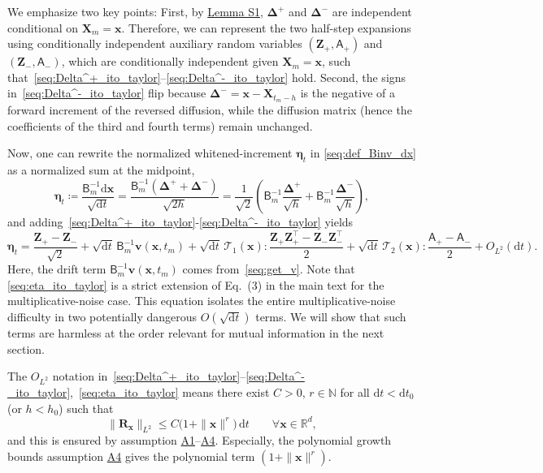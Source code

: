 \documentclass[
 longbibliography,
 twocolumn,
 superscriptaddress,
 amsmath,
 amssymb,
 amsthm,
 amsfonts,
 prl,
 floatfix,
]{revtex4-2}
\newcommand{\matbf}[1]{\boldsymbol{\mathsf{#1}}}
\begin{document}
\begin{widetext}
We emphasize two key points: First, by \hyperlink{lem:S1}{Lemma S1}, $\bm{\Delta}^+$ and $\bm{\Delta}^-$ are independent conditional on $\bm{X}_m=\bm{x}$.
Therefore, we can represent the two half-step expansions using conditionally independent auxiliary random variables $(\bm{Z}_+,\matbf{A}_+)$ and $(\bm{Z}_-,\matbf{A}_-)$, which are conditionally independent given $\bm{X}_m=\bm{x}$, such that~\eqref{seq:Delta^+_ito_taylor}--\eqref{seq:Delta^-_ito_taylor} hold.
Second, the signs in~\eqref{seq:Delta^-_ito_taylor} flip because $\bm\Delta^-=\bm{x}-\bm{X}_{t_m-h}$ is the negative of a forward increment of the reversed diffusion, while the diffusion matrix (hence the coefficients of the third and fourth terms) remain unchanged.

Now, one can rewrite the normalized whitened-increment $\bm\eta_t$ in \eqref{seq:def_Binv_dx} as a normalized sum at the midpoint,
\begin{equation}
    \bm\eta_t\coloneq
    \frac{\matbf{B}_m^{-1}\mathrm{d}\bm{x}}{\sqrt{\mathrm{d}t}}
    =\frac{\matbf{B}_m^{-1}(\bm\Delta^++\bm\Delta^-)}{\sqrt{2h}}
    =\frac{1}{\sqrt{2}}\left(\matbf{B}_m^{-1}\frac{\bm\Delta^+}{\sqrt{h}}
    +\matbf{B}_m^{-1}\frac{\bm\Delta^-}{\sqrt{h}}\right),
    \label{seq:def_midpoint_normalized_sum}
\end{equation}
and adding~\eqref{seq:Delta^+_ito_taylor}-\eqref{seq:Delta^-_ito_taylor} yields
\begin{equation}
    \bm\eta_t
    =\frac{\bm{Z}_+-\bm{Z}_-}{\sqrt{2}}
    +\sqrt{\mathrm{d}t}\,\matbf{B}_m^{-1}\bm{v}(\bm{x},t_m)
    +\sqrt{\mathrm{d}t}\,\mathcal{T}_1(\bm{x})\!:\!
    \frac{\bm{Z}_+\bm{Z}_+^\intercal-\bm{Z}_-\bm{Z}_-^\intercal}{2}
    +\sqrt{\mathrm{d}t}\,\mathcal{T}_2(\bm{x})\!:\!\frac{
    \matbf{A}_+-\matbf{A}_-}{2}
    +O_{L^2}(\mathrm{d}t).
    \label{seq:eta_ito_taylor}
\end{equation}
Here, the drift term $\matbf{B}_m^{-1}\bm{v}(\bm{x},t_m)$ comes from~\eqref{seq:get_v}. Note that \eqref{seq:eta_ito_taylor} is a strict extension of Eq.~(3) in the main text for the multiplicative-noise case.
This equation isolates the entire multiplicative-noise difficulty in two potentially dangerous $O(\sqrt{\mathrm dt})$ terms. We will show that such terms are harmless at the order relevant for mutual information in the next section.

The $O_{L^2}$ notation in~\eqref{seq:Delta^+_ito_taylor}--\eqref{seq:Delta^-_ito_taylor},~\eqref{seq:eta_ito_taylor} means there exist $C>0$, $r\in\mathbb N$ for all $\mathrm dt<\mathrm dt_0$ (or $h<h_0$) such that
\begin{equation}
    \|\bm R_{\bm x}\|_{L^2}\leq
    C\big(1+\|\bm x\|^r\big)\,\mathrm dt
    \qquad
    \forall\bm x\in \mathbb R^d,
\end{equation}
and this is ensured by assumption \hyperlink{assumption:A1}{A1}--\hyperlink{assumption:A4}{A4}. Especially, the polynomial growth bounds assumption \hyperlink{assumption:A4}{A4} gives the polynomial term $(1+\|\bm x\|^r)$.



\end{widetext}
\end{document}
